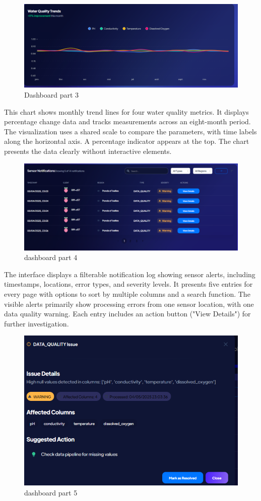 \begin{figure}[H]
    \centering
    \includegraphics[width=0.75\linewidth]{Figures/dashboard4.png}
    \caption{Dashboard part 3}
    \label{fig:enter-label}
\end{figure}
This chart shows monthly trend lines for four water quality metrics. It displays percentage change data and tracks measurements across an eight-month period. The visualization uses a shared scale to compare the parameters, with time labels along the horizontal axis. A percentage indicator appears at the top. The chart presents the data clearly without interactive elements.
\begin{figure}[H]
    \centering
    \includegraphics[width=0.75\linewidth]{Figures/admin5.png}
    \caption{dashboard part 4}
    \label{fig:enter-label}
\end{figure}
The interface displays a filterable notification log showing sensor alerts, including timestamps, locations, error types, and severity levels. It presents five entries for every page with options to sort by multiple columns and a search function. The visible alerts primarily show processing errors from one sensor location, with one data quality warning. Each entry includes an action button ("View Details") for further investigation.
\begin{figure}[H]
    \centering
    \includegraphics[width=0.7\linewidth]{Figures/admin8.png}
    \caption{dashboard part 5}
    \label{fig:enter-label}
\end{figure}

